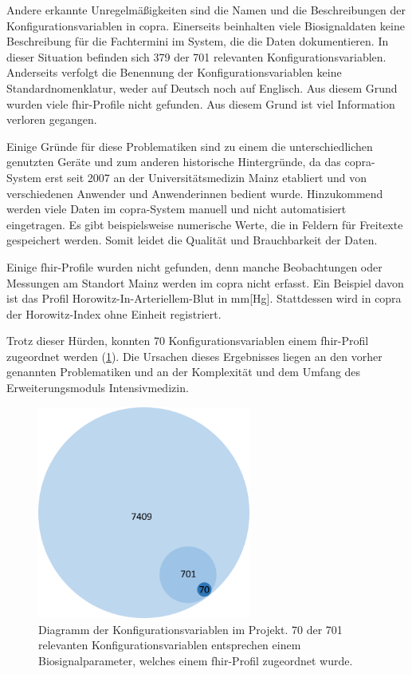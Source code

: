 Andere erkannte Unregelmäßigkeiten sind die Namen und die Beschreibungen der Konfigurationsvariablen in \ac{copra}. Einerseits beinhalten viele Biosignaldaten keine Beschreibung für die Fachtermini im System, die die Daten dokumentieren. In dieser Situation befinden sich 379 der 701 relevanten Konfigurationsvariablen. Anderseits verfolgt die Benennung der Konfigurationsvariablen keine Standardnomenklatur, weder auf Deutsch noch auf Englisch. Aus diesem Grund wurden viele \ac{fhir}-Profile nicht gefunden. Aus diesem Grund ist viel Information verloren gegangen.

Einige Gründe für diese Problematiken sind zu einem die unterschiedlichen genutzten Geräte und zum anderen historische Hintergründe, da das \ac{copra}-System erst seit 2007 an der Universitätsmedizin Mainz etabliert und von verschiedenen Anwender und Anwenderinnen bedient wurde. Hinzukommend werden viele Daten im \ac{copra}-System manuell und nicht automatisiert eingetragen. Es gibt beispielsweise numerische Werte, die in Feldern für Freitexte gespeichert werden. Somit leidet die Qualität und Brauchbarkeit der Daten.

Einige \ac{fhir}-Profile wurden nicht gefunden, denn manche Beobachtungen oder Messungen am Standort Mainz werden im \ac{copra} nicht erfasst. Ein Beispiel davon ist das Profil \glqq Horowitz-In-Arteriellem-Blut\grqq{} in mm[Hg]. Stattdessen wird in \ac{copra} der Horowitz-Index ohne Einheit registriert.

Trotz dieser Hürden, konnten 70 Konfigurationsvariablen einem \ac{fhir}-Profil zugeordnet werden (\ref{fig:conf_var}). Die Ursachen dieses Ergebnisses liegen an den vorher genannten Problematiken und an der Komplexität und dem Umfang des Erweiterungsmoduls \glqq Intensivmedizin\grqq{}.

\begin{figure}[ht]
	\centering
	\includegraphics[height=7cm]{figures/config_var}
	\caption[Diagramm der Konfigurationsvariablen im Projekt]{Diagramm der Konfigurationsvariablen im Projekt. 70 der 701 relevanten Konfigurationsvariablen entsprechen einem Biosignalparameter, welches einem \ac{fhir}-Profil zugeordnet wurde. 
	}
	\label{fig:conf_var}
\end{figure}